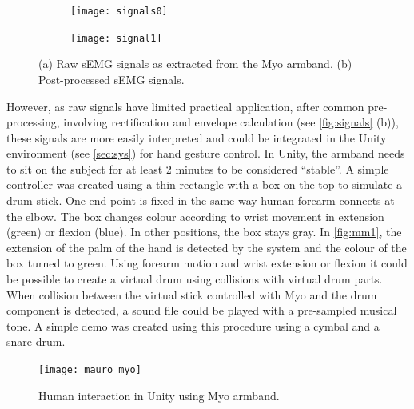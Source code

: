 \documentclass{vgtc}
\begin{document}
\begin{figure}
\centering
\begin{subfigure}{.5\columnwidth}
  \centering
  \texttt{[image: signals0]}
  \label{fig:sig0}
  \caption{}
\end{subfigure}%
\begin{subfigure}{.5\columnwidth}
  \centering
  \texttt{[image: signal1]}
  \label{fig:sig1}
  \caption{}
\end{subfigure}
\caption{(a) Raw sEMG signals as extracted from the Myo armband, (b) Post-processed sEMG signals.}
\label{fig:signals}
\end{figure}

However, as raw signals have limited practical application, after common pre-processing, involving rectification and envelope calculation (see \autoref{fig:signals} (b)), these signals are more easily interpreted and could be integrated in the Unity environment \cite{unity} (see \autoref{sec:sys}) for hand gesture control. 
In Unity, the armband needs to sit on the subject for at least 2 minutes to be considered “stable”. A simple controller was created using a thin rectangle with a box on the top to simulate a drum-stick. One end-point is fixed in the same way human forearm connects at the elbow. The box changes colour according to wrist movement in extension (green) or flexion (blue). In other positions, the box stays gray. In \autoref{fig:mm1}, the extension of the palm of the hand is detected by the system and the colour of the box turned to green. Using forearm motion and wrist extension or flexion it could be possible to create a virtual drum using collisions with virtual drum parts. When collision between the virtual stick controlled with Myo and the drum component is detected, a sound file could be played with a pre-sampled musical tone. A simple demo was created using this procedure using a cymbal and a snare-drum.
\begin{figure}[h]
\texttt{[image: mauro\_myo]}
\caption{Human interaction in Unity using Myo armband.}
\centering
\label{fig:mm1}
\end{figure}
\end{document}
